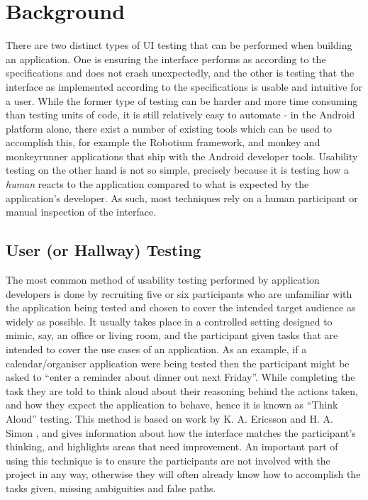 \chapter{Background}

There are two distinct types of UI testing that can be performed when building
an application. One is ensuring the interface performs as according to the
specifications and does not crash unexpectedly, and the other is testing that
the interface as implemented according to the specifications is usable and
intuitive for a user. While the former type of testing can be harder and more
time consuming than testing units of code, it is still relatively easy to
automate - in the Android platform alone, there exist a number of existing
tools which can be used to accomplish this, for example the Robotium
\cite{robotium} framework, and monkey and monkeyrunner \cite{monkeyrunner}
applications that ship with the Android developer tools. Usability testing on
the other hand is not so simple, precisely because it is testing how
a \emph{human} reacts to the application compared to what is expected by the
application's developer. As such, most techniques rely on a human participant
or manual inspection of the interface.

\section{User (or Hallway) Testing}

The most common method of usability testing performed by application developers
is done by recruiting five or six participants who are unfamiliar with the
application being tested and chosen to cover the intended target audience as
widely as possible. It usually takes place in a controlled setting designed to
mimic, say, an office or living room, and the participant given tasks that are
intended to cover the use cases of an application. As an example, if
a calendar/organiser application were being tested then the participant might
be asked to ``enter a reminder about dinner out next Friday''. While completing
the task they are told to think aloud about their reasoning behind the actions
taken, and how they expect the application to behave, hence it is known as
``Think Aloud'' testing. This method is based on work by K. A. Ericsson and H.
A. Simon \cite{ericsson1980verbal}, and gives information about how the
interface matches the participant's thinking, and highlights areas that need
improvement. An important part of using this technique is to ensure the
participants are not involved with the project in any way, otherwise they will
often already know how to accomplish the tasks given, missing ambiguities and
false paths.

